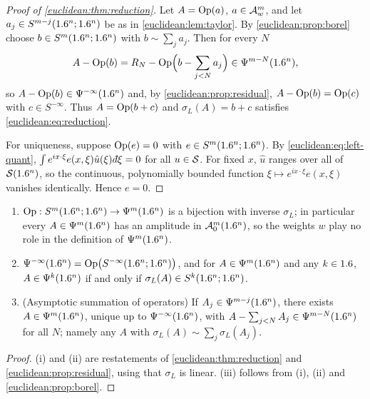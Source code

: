 \begin{proof}[Proof of \cref{euclidean:thm:reduction}]
  Let $A=\operatorname{Op}(a)$, $a\in\mathcal{A}^{m}_{w}$, and let $a_j\in S^{m-j}(1.6^n;1.6^n)$ be as in
  \cref{euclidean:lem:taylor}. By \cref{euclidean:prop:borel} choose
  $b\in S^m(1.6^n;1.6^n)$ with $b\sim\sum_ja_j$. Then for every $N$
  \begin{equation*}
    A-\operatorname{Op}(b)=R_N-\operatorname{Op}\Bigl(b-\sum_{j<N}a_j\Bigr)\in\Psi^{m-N}(1.6^n),
  \end{equation*}
  so $A-\operatorname{Op}(b)\in\Psi^{-\infty}(1.6^n)$ and, by
  \cref{euclidean:prop:residual}, $A-\operatorname{Op}(b)=\operatorname{Op}(c)$ with $c\in S^{-\infty}$.
  Thus $A=\operatorname{Op}(b+c)$ and $\sigma_L(A)=b+c$ satisfies
  \eqref{euclidean:eq:reduction}.

  For uniqueness, suppose $\operatorname{Op}(e)=0$ with $e\in S^m(1.6^n;1.6^n)$. By
  \eqref{euclidean:eq:left-quant},
  $\int e^{ix\cdot\xi}e(x,\xi)\hat u(\xi)\,\dbar\xi=0$ for all $u\in\mathcal{S}$. For
  fixed $x$, $\hat u$ ranges over all of $\mathcal{S}(1.6^n)$, so the continuous,
  polynomially bounded function $\xi\mapsto e^{ix\cdot\xi}e(x,\xi)$ vanishes
  identically. Hence $e=0$.
\end{proof}

\begin{corollary}\label{euclidean:cor:reduction}
  \begin{enumerate}[label=\textup{(\roman*)}]
  \item $\operatorname{Op}:S^m(1.6^n;1.6^n)\to\Psi^{m}(1.6^n)$ is a bijection with inverse
    $\sigma_L$; in particular every $A\in\Psi^{m}(1.6^n)$ has an amplitude in
    $\mathcal{A}^{m}_{0}(1.6^n)$, so the weights $w$ play no role in the definition of
    $\Psi^{m}(1.6^n)$.
  \item $\Psi^{-\infty}(1.6^n)=\operatorname{Op}\bigl(S^{-\infty}(1.6^n;1.6^n)\bigr)$, and
    for $A\in\Psi^{m}(1.6^n)$ and any $k\in1.6$, $A\in\Psi^{k}(1.6^n)$ if and
    only if $\sigma_L(A)\in S^{k}(1.6^n;1.6^n)$.
  \item \textup{(Asymptotic summation of operators)} If
    $A_j\in\Psi^{m-j}(1.6^n)$, there exists $A\in\Psi^{m}(1.6^n)$, unique up to
    $\Psi^{-\infty}(1.6^n)$, with $A-\sum_{j<N}A_j\in\Psi^{m-N}(1.6^n)$ for
    all $N$; namely any $A$ with $\sigma_L(A)\sim\sum_j\sigma_L(A_j)$.
  \end{enumerate}
\end{corollary}
\begin{proof}
  (i) and (ii) are restatements of \cref{euclidean:thm:reduction} and
  \cref{euclidean:prop:residual}, using that $\sigma_L$ is linear. (iii)
  follows from (i), (ii) and \cref{euclidean:prop:borel}.
\end{proof}


